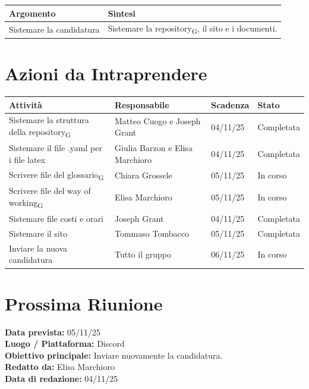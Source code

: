 \documentclass[a4paper,12pt]{article}
\newcommand{\gls}[1]{#1\textsubscript{G}}
\begin{document}
\begin{longtable}{|p{}|p{}|}
\hline
\textbf{Argomento} & \textbf{Sintesi} \\ \hline
Sistemare la candidatura & Sistemare la \gls{repository}, il sito e i documenti. \\ \hline

\end{longtable}

\pagebreak
\section*{ Azioni da Intraprendere}

\begin{longtable}{|p{}|p{}|p{}|p{}|}
\hline
\textbf{Attività} & \textbf{Responsabile} & \textbf{Scadenza} & \textbf{Stato} \\ \hline
Sistemare la struttura della \gls{repository} & Matteo Cuogo e Joseph Grant & 04/11/25 & Completata \\ \hline
Sistemare il file .yaml per i file latex & Giulia Barzon e Elisa Marchioro & 04/11/25 & Completata \\ \hline
Scrivere file del \gls{glossario} & Chiara Grossele & 05/11/25 & In corso \\ \hline
Scrivere file del \gls{way of working} & Elisa Marchioro & 05/11/25 & In corso \\ \hline
Sistemare file costi e orari & Joseph Grant & 04/11/25 & Completata \\ \hline
Sistemare il sito & Tommaso Tombacco & 05/11/25 & Completata \\ \hline
Inviare la nuova candidatura & Tutto il gruppo & 06/11/25 & In corso \\ \hline
\end{longtable}


\section*{ Prossima Riunione}
\textbf{Data prevista:} 05/11/25 \\
\textbf{Luogo / Piattaforma:} Discord \\
\textbf{Obiettivo principale:} Inviare nuovamente la candidatura. \\
\textbf{Redatto da:} Elisa Marchioro \\
\textbf{Data di redazione:} 04/11/25
\end{document}
